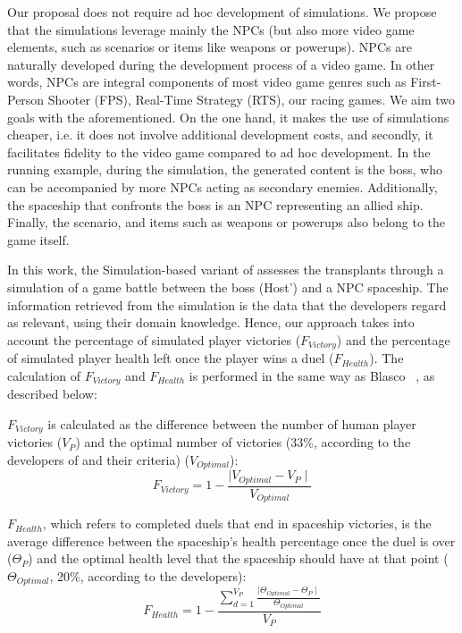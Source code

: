 Our proposal does not require ad hoc development of simulations. We propose that the simulations leverage mainly the NPCs (but also more video game elements, such as scenarios or items like weapons or powerups). NPCs are naturally developed during the development process of a video game. In other words, NPCs are integral components of  most video game genres such as First-Person Shooter (FPS), Real-Time Strategy (RTS), our racing games. We aim two goals with the aforementioned. On the one hand, it makes the use of simulations cheaper, i.e. it does not involve additional development costs, and secondly, it facilitates fidelity to the video game compared to ad hoc development. In the running example, during the simulation, the generated content is the boss, who can be accompanied by more NPCs acting as secondary enemies. Additionally, the spaceship that confronts the boss is an NPC representing an allied ship. Finally, the scenario, and items such as weapons or powerups also belong to the game itself.

In this work, the Simulation-based variant of \ApproachName{} assesses the transplants through a simulation of a game battle between the boss (Host') and a NPC spaceship. The information retrieved from the simulation is the data that the developers regard as relevant, using their domain knowledge. Hence, our approach takes into account  the percentage of simulated player victories ($F_{Victory}$) and the percentage of simulated player health left once the player wins a duel ($F_{Health}$).
The calculation of $F_{Victory}$ and $F_{Health}$ is performed in the same way as Blasco \etal~\cite{blasco2021evolutionary}, as described below:

$F_{Victory}$ is calculated as the difference between the number of human player victories ($V_{P}$) and the optimal number of victories (33\%, according to the developers of \CaseStudy{} and their criteria) ($V_{Optimal}$):
\begin{equation}
F_{Victory} = 1 -\frac{\mid V_{Optimal} - V_{P} \mid}{ V_{Optimal}}
\end{equation}

$F_{Health}$, which refers to completed duels that end in spaceship victories, is the average difference between the spaceship's health percentage once the duel is over ($\Theta_{P}$) and the optimal health level that the spaceship should have at that point ($\Theta_{Optimal}$, 20\%, according to the developers):
\begin{equation}
F_{Health} = 1 - \frac{\sum\limits_{d=1}^{V_{P}}\frac{\mid \Theta_{Optimal} - \Theta_{P} \mid}{ \Theta_{Optimal}}}{V_{P}}
\end{equation}

